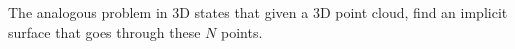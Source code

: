 The analogous problem in 3D states that given a 3D point cloud, find an implicit surface that goes
through these $N$ points.